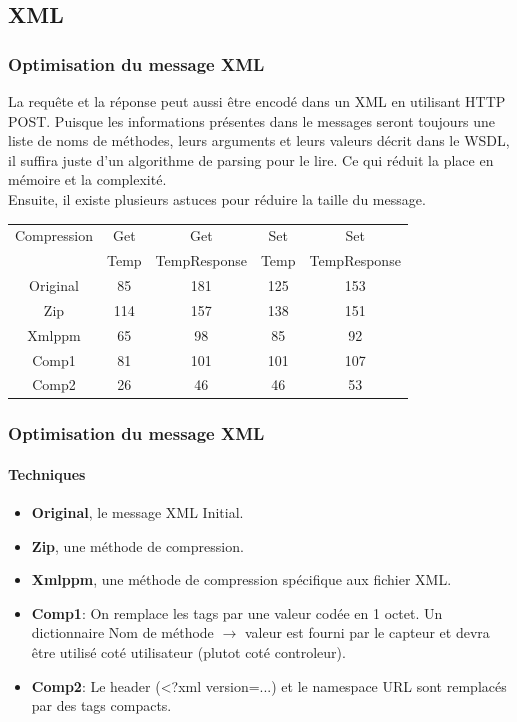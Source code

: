 \subsection{XML}
\begin{frame}
 \frametitle{Optimisation du message XML}
 La requête et la réponse peut aussi être encodé dans un XML en utilisant HTTP POST.
 Puisque les informations présentes dans le messages seront toujours une liste de noms de méthodes, leurs arguments et leurs valeurs décrit dans le WSDL, il suffira juste d'un algorithme de parsing pour le lire.
 Ce qui réduit la place en mémoire et la complexité.\\
 \vspace{4mm}
 Ensuite, il existe plusieurs astuces pour réduire la taille du message.\\
 \begin{center}
  \begin{tabular}{|c|c|c|c|c|}
   \hline
   Compression & Get & Get & Set & Set\\
   ~ & Temp & TempResponse & Temp & TempResponse\\
   \hline
   Original & 85 & 181 & 125 & 153\\
   \hline
   Zip & 114 & 157 & 138 & 151\\
   Xmlppm & 65 & 98 & 85 & 92\\
   \hline
   Comp1 & 81 & 101 & 101 & 107\\
   Comp2 & 26 & 46 & 46 & 53\\
   \hline
  \end{tabular}
 \end{center}
\end{frame}

\begin{frame}
 \frametitle{Optimisation du message XML}
 \framesubtitle{Techniques}
 \begin{itemize}
  \item \textbf{Original}, le message XML Initial.
  \item \textbf{Zip}, une méthode de compression.
  \item \textbf{Xmlppm}, une méthode de compression spécifique aux fichier XML.
  \item \textbf{Comp1}: On remplace les tags par une valeur codée en 1 octet.
  Un dictionnaire Nom de méthode $\rightarrow$ valeur est fourni par le capteur et devra être utilisé coté utilisateur (plutot coté controleur).
  \item \textbf{Comp2}: Le header (<?xml version=...) et le namespace URL sont remplacés par des tags compacts.
 \end{itemize}
\end{frame}
